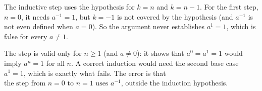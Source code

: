 The inductive step uses the hypothesis for $k=n$ and $k=n-1$. For the first step, $n=0$, it needs $a^{-1}=1$, but $k=-1$ is not covered by the hypothesis (and $a^{-1}$ is not even defined when $a=0$). So the argument never establishes $a^1=1$, which is false for every $a\ne1$.

The step is valid only for $n\ge1$ (and $a\ne0$): it shows that $a^0=a^1=1$ would imply $a^n=1$ for all $n$. A correct induction would need the second base case $a^1=1$, which is exactly what fails. The error is that $\boxed{\text{the step from }n=0\text{ to }n=1\text{ uses }a^{-1}}$, outside the induction hypothesis.
